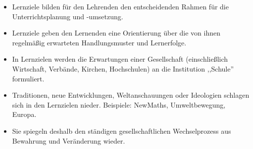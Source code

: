 \begin{itemize}
	\item Lernziele bilden f\"{u}r den Lehrenden den entscheidenden Rahmen f\"{u}r die
	Unterrichtsplanung und -umsetzung.
	\item Lernziele geben den Lernenden eine Orientierung über die von ihnen regelmäßig erwarteten Handlungsmuster und Lernerfolge.
	\item In Lernzielen werden die Erwartungen einer Gesellschaft
	(einschlie{\ss}lich Wirtschaft, Verb\"{a}nde, Kirchen, Hochschulen) an
	die Institution ,,Schule'' formuliert.
	\item Traditionen, neue Entwicklungen, Weltanschauungen oder
	Ideologien schlagen sich in den Lernzielen nieder.
	Beispiele: NewMaths, Umweltbewegung, Europa.
	\item
	Sie spiegeln deshalb den st\"{a}ndigen gesellschaftlichen
	Wechselprozess aus Bewahrung und Ver\"{a}nderung wieder.
%	
\end{itemize}

